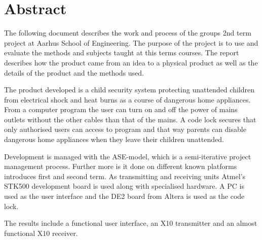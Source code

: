 \chapter*{Abstract}
The following document describes the work and process of the groups 2nd term project at Aarhus School of Engineering. The purpose of the project is to use and evaluate the methods and subjects taught at this terms courses. The report describes how the product came from an idea to a physical product as well as the details of the product and the methods used.

The product developed is a child security system protecting unattended children from electrical shock and heat burns as a course of dangerous home appliances. From a computer program the user can turn on and off the power of mains outlets without the other cables than that of the mains. A code lock secures that only authorised users can access to program and that way parents can disable dangerous home appliances when they leave their children unattended.

Development is managed with the ASE-model, which is a semi-iterative project management process. Further more is it done on different known platforms introduces first and second term. As transmitting and receiving units Atmel’s STK500 development board is used along with specialised hardware. A PC is used as the user interface and the DE2 board from Altera is used as the code lock.

The results include a functional user interface, an X10 transmitter and an almost functional X10 receiver.